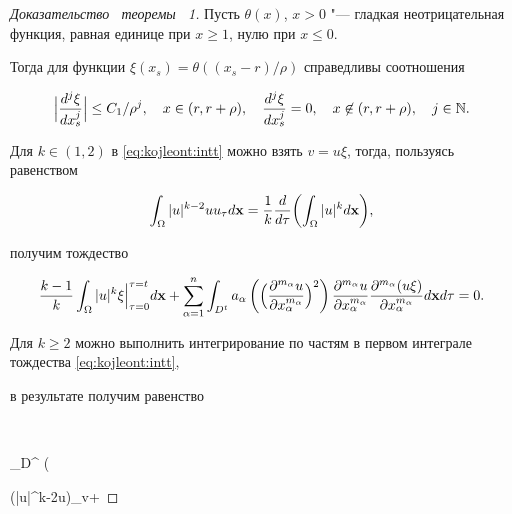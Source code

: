 \begin{proof}[Доказательство \ теоремы \ 1]

Пусть $\theta(x)$, $x>0$ "--- гладкая неотрицательная функция, равная единице при $x\ge 1$, нулю при $x\le 0$. 

Тогда для функции $\xi(x_s)=\theta((x_s-r)/\rho)$ справедливы соотношения 

\begin{equation}

\label{eq:kojleont:the_1(0)} 

\Bigl|\frac{d^{j}\xi}{d x_s^{j}}\Bigr|\leq C_1/\rho^j,\quad x\in(r,r+\rho),\quad

\frac{d^{j}\xi}{d x_s^{j}}= 0,\quad x\not\in(r,r+\rho),\quad j \in

\mathbb{N}.

\end{equation}



Для $k\in(1, 2)$ в \eqref{eq:kojleont:intt} можно взять $v=u\xi$, тогда, пользуясь равенством

$$\int_{\Omega}|u|^{k-2}uu_{\tau}d{\bf x}=\frac{1}{k}\frac{d}{d\tau}\biggl(\int_{\Omega}|u|^kd{\bf x}\biggr),$$

получим  тождество

\begin{equation}

\frac{k-1}{k}\int_{ \Omega}|u|^{k} \xi \Bigl |_{ \tau=0}^{  \tau=t}d{\bf x}

  +

  \sum\limits_{\alpha=1}^n\int_{D^{t}}

  a_{\alpha}\left(\Bigl(\frac{\partial^{m_\alpha}u}{\partial x_\alpha^{m_\alpha}}\Bigr)^2\right)

  \frac{\partial^{m_\alpha}u}{\partial x_\alpha^{m_\alpha}}

\frac{\partial^{m_\alpha}(u\xi)}{\partial x_\alpha^{m_\alpha}} d{\bf x}d\tau =0.

\label{eq:kojleont:teorem_3_2(14_1)}

\end{equation}

 Для $k\geq 2$ можно выполнить интегрирование по частям в первом интеграле тождества \eqref{eq:kojleont:intt},

 в результате получим равенство

$$

\int_{D^{\tau}} \biggl(

(|u|^{k-2}u)_{\tau}v+


\end{proof}
